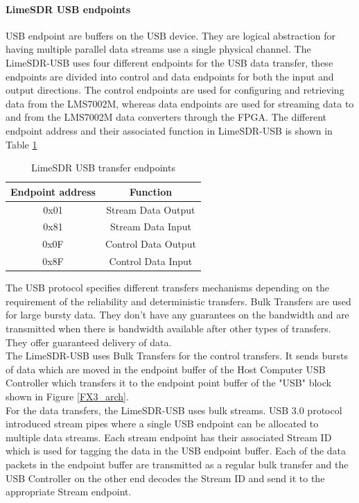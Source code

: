 \paragraph{LimeSDR USB endpoints}
\ac{USB} endpoint are buffers on the \ac{USB} device.
They are logical abstraction for having multiple parallel data streams use a single physical channel.
The LimeSDR-USB uses four different endpoints for the USB data transfer, these endpoints are divided into control and data endpoints for both the input and output directions.
The control endpoints are used for configuring and retrieving data from the LMS7002M, whereas data endpoints are used for streaming data to and from the LMS7002M data converters through the \ac{FPGA}.
The different endpoint address and their associated function in LimeSDR-USB is shown in Table \ref{Lime-USB_ep}\\

\begin{table}[h!]
\centering
\begin{tabular}{|c|c|}
\hline
Endpoint address & Function\\
\hline
0x01 & Stream Data Output\\
0x81 & Stream Data Input\\
0x0F & Control Data Output\\
0x8F & Control Data Input\\
\hline
\end{tabular}
\caption{LimeSDR USB transfer endpoints}
\label{Lime-USB_ep}
\end{table}

The \ac{USB} protocol specifies different transfers mechanisms depending on the requirement of the reliability and deterministic transfers.
Bulk Transfers are used for large bursty data.
They don't have any guarantees on the bandwidth and are transmitted when there is bandwidth available after other types of transfers.
They offer guaranteed delivery of data.\\

The LimeSDR-USB uses Bulk Transfers for the control transfers.
It sends bursts of data which are moved in the endpoint buffer of the Host Computer USB Controller which transfers it to the endpoint point buffer of the "USB" block shown in Figure \ref{FX3_arch}.\\

For the data transfers, the LimeSDR-USB uses bulk streams.
USB 3.0 protocol introduced stream pipes where a single \ac{USB} endpoint can be allocated to multiple data streams.
Each stream endpoint has their associated Stream ID which is used for tagging the data in the USB endpoint buffer.
Each of the data packets in the endpoint buffer are transmitted as a regular bulk transfer and the USB Controller on the other end decodes the Stream ID and send it to the appropriate Stream endpoint. \\

